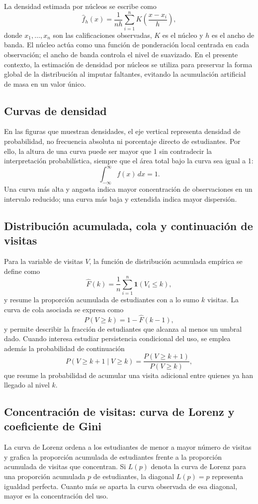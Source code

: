 \documentclass[10pt,letterpaper]{article} %
\numberwithin{figure}{subsection}
\begin{document}
La densidad estimada por núcleos se escribe como
\[
\hat f_h(x)=\frac{1}{nh}\sum_{i=1}^{n}K\!\left(\frac{x-x_i}{h}\right),
\]
donde $x_1,\dots,x_n$ son las calificaciones observadas, $K$ es el núcleo y $h$ es el ancho de banda. El núcleo actúa como una función de ponderación local centrada en cada observación; el ancho de banda controla el nivel de suavizado. En el presente contexto, la estimación de densidad por núcleos se utiliza para preservar la forma global de la distribución al imputar faltantes, evitando la acumulación artificial de masa en un valor único.

\subsection{Curvas de densidad}
\label{apx:density}
En las figuras que muestran densidades, el eje vertical representa densidad de probabilidad, no frecuencia absoluta ni porcentaje directo de estudiantes. Por ello, la altura de una curva puede ser mayor que 1 sin contradecir la interpretación probabilística, siempre que el área total bajo la curva sea igual a 1:
\[
\int_{-\infty}^{\infty} f(x)\,dx = 1.
\]
Una curva más alta y angosta indica mayor concentración de observaciones en un intervalo reducido; una curva más baja y extendida indica mayor dispersión.

\subsection{Distribución acumulada, cola y continuación de visitas}
\label{apx:ecdf-tail}
Para la variable de visitas $V$, la función de distribución acumulada empírica se define como
\[
\hat F(k)=\frac{1}{n}\sum_{i=1}^{n}\mathbf{1}(V_i\leq k),
\]
y resume la proporción acumulada de estudiantes con a lo sumo $k$ visitas. La curva de cola asociada se expresa como
\[
P(V\geq k)=1-\hat F(k-1),
\]
y permite describir la fracción de estudiantes que alcanza al menos un umbral dado. Cuando interesa estudiar persistencia condicional del uso, se emplea además la probabilidad de continuación
\[
P(V\geq k+1 \mid V\geq k)=\frac{P(V\geq k+1)}{P(V\geq k)},
\]
que resume la probabilidad de acumular una visita adicional entre quienes ya han llegado al nivel $k$.

\subsection{Concentración de visitas: curva de Lorenz y coeficiente de Gini}
\label{apx:lorenz-gini}
La curva de Lorenz ordena a los estudiantes de menor a mayor número de visitas y grafica la proporción acumulada de estudiantes frente a la proporción acumulada de visitas que concentran. Si $L(p)$ denota la curva de Lorenz para una proporción acumulada $p$ de estudiantes, la diagonal $L(p)=p$ representa igualdad perfecta. Cuanto más se aparta la curva observada de esa diagonal, mayor es la concentración del uso.
\end{document}
